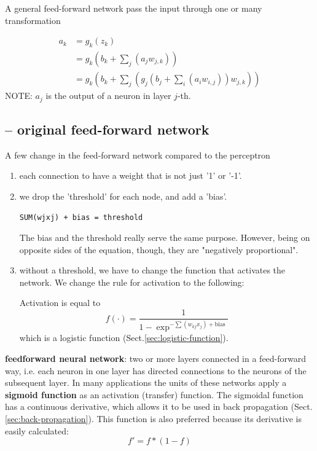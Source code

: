 A general feed-forward network pass the input through one or many transformation

\begin{equation}
\begin{split}
a_k &= g_k \left( z_k \right) \\
    &= g_k \left(b_k + \sum_j (a_{j} w_{j,k}) \right) \\
    &= g_k \left(b_k + \sum_j (g_{j}\left( b_j + \sum_i (a_{i} w_{i,j}) \right)
    w_{j,k}) \right)
\end{split}
\end{equation}
NOTE: $a_{j}$ is the output of a neuron in layer $j$-th.

\subsection{-- original feed-forward network}

A few change in the feed-forward network compared to the perceptron
\begin{enumerate}
  \item  each connection to have a weight that is not just '1' or '-1'.
  
  \item we drop the 'threshold' for each node, and add a 'bias'. 
  
\begin{verbatim}
SUM(wjxj) + bias = threshold
\end{verbatim}
The bias and the threshold really serve the same purpose.
However, being on opposite sides of the equation, though, they are "negatively
proportional".

  \item without a threshold, we have to change the function that activates
  the network. We change the rule for activation to the following:

Activation is equal to 
\begin{equation}
f(\cdot) = \frac{1}{1- \exp^{-\sum(w_{kj}x_j)+\text{bias}}}
\end{equation}
which is a logistic function (Sect.\ref{sec:logistic-function}).
\end{enumerate}

{\bf feedforward neural network}: two or more layers connected in a
  feed-forward way, i.e. each neuron in one layer has directed connections to
  the neurons of the subsequent layer. In many applications the units of these
  networks apply a {\bf sigmoid function} as an activation (transfer) function.
The sigmoidal function has a continuous derivative, which allows it to be
used in back propagation (Sect.\ref{sec:back-propagation}). This function is
also preferred because its derivative is easily calculated:
\begin{equation}
f' = f * (1-f)
\end{equation}

